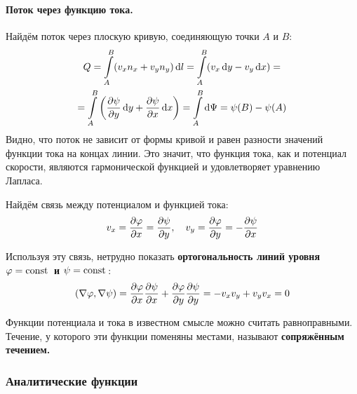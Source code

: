 \paragraph{Поток через функцию тока.} Найдём поток через плоскую
кривую, соединяющую точки $A$ и $B$:
\begin{gather}
    Q = \int\limits_A^B (v_x n_x + v_y n_y)\dd{l}=
    \int\limits_A^B (v_x \dd{y} - v_y \dd{x})=\\=
    \int\limits_A^B \qty(\pdv{\psi}{y}\dd{y}+\pdv{\psi}{x}\dd{x})=
    \int\limits_A^B \dd{\Psi} = \psi(B)-\psi(A)
\end{gather}
Видно, что поток не зависит от формы кривой и равен разности значений
функции тока на концах линии. Это значит, что функция тока, как и потенциал скорости, являются гармонической функцией и удовлетворяет уравнению Лапласа.

Найдём связь между потенциалом и функцией тока:
\begin{equation}
    v_x = \pdv{\varphi}{x}= \pdv{\psi}{y}, \quad
    v_y = \pdv{\varphi}{y} = -\pdv{\psi}{x}
\end{equation}

Используя эту связь, нетрудно показать \textbf{ортогональность линий
уровня $\varphi=\mathrm{const}\,$ и $\psi=\mathrm{const}\,$}:
\begin{equation}
    \qty(\nabla\varphi,\nabla\psi) =
    \pdv{\varphi}{x}\pdv{\psi}{x} +
    \pdv{\varphi}{y}\pdv{\psi}{y} = -v_x v_y+ v_y v_x = 0
\end{equation}

Функции потенциала и тока в известном смысле можно считать равноправными. Течение, у которого эти функции поменяны местами, называют \textbf{сопряжённым течением.}


\subsubsection{Аналитические функции}


